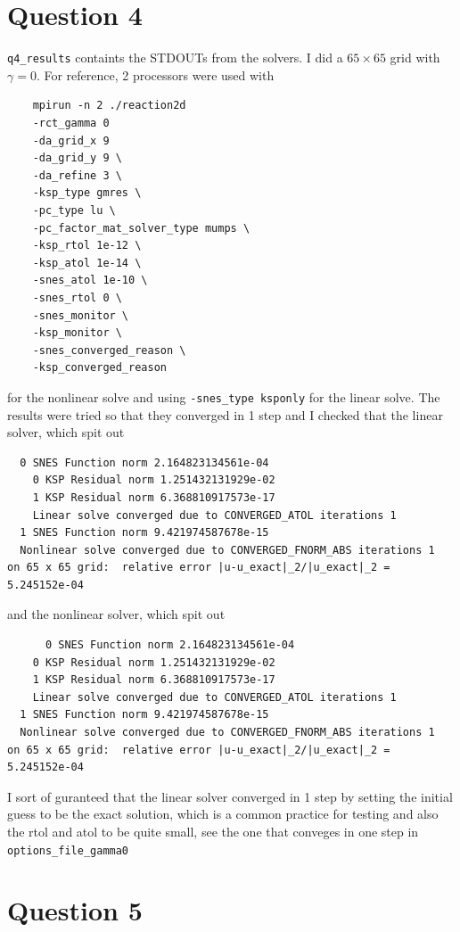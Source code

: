\documentclass[12pt]{article}
\begin{document}
\section{Question 4}

\texttt{q4\_results} containts the STDOUTs from the solvers. I did a $65 \times 65$ grid with $\gamma = 0$. For reference, 2 processors were used with 
\begin{verbatim}
    mpirun -n 2 ./reaction2d 
    -rct_gamma 0 
    -da_grid_x 9 
    -da_grid_y 9 \
    -da_refine 3 \
    -ksp_type gmres \
    -pc_type lu \
    -pc_factor_mat_solver_type mumps \
    -ksp_rtol 1e-12 \
    -ksp_atol 1e-14 \
    -snes_atol 1e-10 \
    -snes_rtol 0 \
    -snes_monitor \
    -ksp_monitor \
    -snes_converged_reason \
    -ksp_converged_reason 
\end{verbatim}
for the nonlinear solve and using \texttt{-snes\_type ksponly} for the linear solve. The results were tried so that they converged in 1 step and I checked that the linear solver, which spit out 
\begin{verbatim}
  0 SNES Function norm 2.164823134561e-04
    0 KSP Residual norm 1.251432131929e-02
    1 KSP Residual norm 6.368810917573e-17
    Linear solve converged due to CONVERGED_ATOL iterations 1
  1 SNES Function norm 9.421974587678e-15
  Nonlinear solve converged due to CONVERGED_FNORM_ABS iterations 1
on 65 x 65 grid:  relative error |u-u_exact|_2/|u_exact|_2 = 5.245152e-04
\end{verbatim} and the nonlinear solver, which spit out
\begin{verbatim}
      0 SNES Function norm 2.164823134561e-04
    0 KSP Residual norm 1.251432131929e-02
    1 KSP Residual norm 6.368810917573e-17
    Linear solve converged due to CONVERGED_ATOL iterations 1
  1 SNES Function norm 9.421974587678e-15
  Nonlinear solve converged due to CONVERGED_FNORM_ABS iterations 1
on 65 x 65 grid:  relative error |u-u_exact|_2/|u_exact|_2 = 5.245152e-04
\end{verbatim}

I sort of guranteed that the linear solver converged in 1 step by setting the initial guess to be the exact solution, which is a common practice for testing and also the rtol and atol to be quite small, see the one that conveges in one step in \texttt{options\_file\_gamma0}

\section{Question 5}
\end{document}
